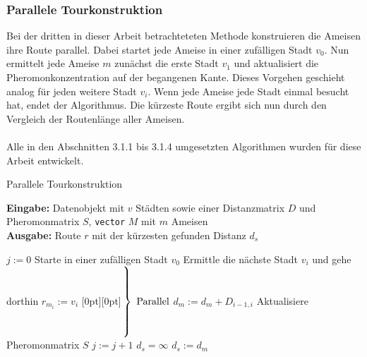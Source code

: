\documentclass[doktyp=barbeit, sprache=german]{TUBAFarbeiten}
\begin{document}
\subsubsection{Parallele Tourkonstruktion}
Bei der dritten in dieser Arbeit betrachteteten Methode konstruieren die Ameisen ihre Route parallel. Dabei startet jede Ameise in einer zufälligen Stadt $v_0$. Nun ermittelt jede Ameise $m$ zunächst die erste Stadt $v_1$ und aktualisiert die Pheromonkonzentration auf der begangenen Kante. Dieses Vorgehen geschieht analog für jeden weitere Stadt $v_i$. Wenn jede Ameise jede Stadt einmal besucht hat, endet der Algorithmus. Die kürzeste Route ergibt sich nun durch den Vergleich der Routenlänge aller Ameisen.
\\\\Alle in den Abschnitten 3.1.1 bis 3.1.4 umgesetzten Algorithmen wurden für diese Arbeit entwickelt.
\begin{algorithm}
\caption{Parallele Tourkonstruktion}
\label{ParallelTour}
\textbf{Eingabe:} Datenobjekt mit $v$ Städten sowie einer Distanzmatrix $D$ und Pheromonmatrix $S$, \texttt{vector} $M$ mit $m$ Ameisen
\\\textbf{Ausgabe:} Route $r$ mit der kürzesten gefunden Distanz $d_s$
\begin{algorithmic}[1]
\State $j := 0$
\State Starte in einer zufälligen Stadt $v_0$
\State Ermittle die nächste Stadt $v_i$ und gehe dorthin
\State $r_{m_i} := v_i$
\hspace{17em}\raisebox{.5\baselineskip}[0pt][0pt]{$\left.\rule{0pt}{3.2\baselineskip}\right\}\ \mbox{Parallel}$}
\State $d_m := d_m + D_{i-1,i}$
\State Aktualisiere Pheromonmatrix $S$
\EndFor
\State $j := j + 1$
\EndWhile
\State $d_s = \infty$
\State $d_s := d_m$
\EndIf
\EndFor
\end{algorithmic}
\end{algorithm}
\end{document}
